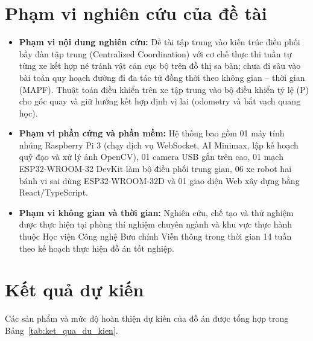 \documentclass[12pt,a4paper]{report}
\begin{document}
	\section{Phạm vi nghiên cứu của đề tài}
	\begin{itemize}[leftmargin=1.2cm]
		\item \textbf{Phạm vi nội dung nghiên cứu:} Đề tài tập trung vào kiến trúc điều phối bầy đàn tập trung (Centralized Coordination) với cơ chế thực thi tuần tự từng xe kết hợp né tránh vật cản cục bộ trên đồ thị sa bàn; chưa đi sâu vào bài toán quy hoạch đường đi đa tác tử đồng thời theo không gian -- thời gian (MAPF). Thuật toán điều khiển trên xe tập trung vào bộ điều khiển tỷ lệ (P) cho góc quay và giữ hướng kết hợp định vị lai (odometry và bắt vạch quang học).
		\item \textbf{Phạm vi phần cứng và phần mềm:} Hệ thống bao gồm 01 máy tính nhúng Raspberry Pi 3 (chạy dịch vụ WebSocket, AI Minimax, lập kế hoạch quỹ đạo và xử lý ảnh OpenCV), 01 camera USB gắn trên cao, 01 mạch ESP32-WROOM-32 DevKit làm bộ điều phối trung gian, 06 xe robot hai bánh vi sai dùng ESP32-WROOM-32D và 01 giao diện Web xây dựng bằng React/TypeScript.
		\item \textbf{Phạm vi không gian và thời gian:} Nghiên cứu, chế tạo và thử nghiệm được thực hiện tại phòng thí nghiệm chuyên ngành và khu vực thực hành thuộc Học viện Công nghệ Bưu chính Viễn thông trong thời gian 14 tuần theo kế hoạch thực hiện đồ án tốt nghiệp.
	\end{itemize}
	
	\section{Kết quả dự kiến}
	Các sản phẩm và mức độ hoàn thiện dự kiến của đồ án được tổng hợp trong Bảng~\ref{tab:ket_qua_du_kien}.
	
\end{document}
